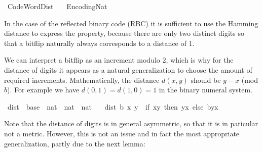 %
\begin{isabellebody}%
%
%
\isadelimdocument
%
\endisadelimdocument
%
\isatagdocument
%
\isamarkuptrue%
%
\endisatagdocument
{\isafolddocument}%
%
\isadelimdocument
%
\endisadelimdocument
%
\isadelimtheory
%
\endisadelimtheory
%
\isatagtheory
{}\isamarkupfalse%
\ Code{\isacharunderscore}{\kern0pt}Word{\isacharunderscore}{\kern0pt}Dist\isanewline
\ \ \ Encoding{\isacharunderscore}{\kern0pt}Nat\isanewline
{}%
\endisatagtheory
{\isafoldtheory}%
%
\isadelimtheory
%
\endisadelimtheory
%
\begin{isamarkuptext}%
In the case of the reflected binary code (RBC) it is sufficient
  to use the Hamming distance to express the property, because there are
  only two distinct digits so that a bitflip naturally always corresponds
  to a distance of 1.%
\end{isamarkuptext}\isamarkuptrue%
%
\isadelimdocument
%
\endisadelimdocument
%
\isatagdocument
%
\isamarkuptrue%
%
\endisatagdocument
{\isafolddocument}%
%
\isadelimdocument
%
\endisadelimdocument
%
\begin{isamarkuptext}%
We can interpret a bitflip as an increment modulo 2, which is why for the
  distance of digits it appears as a natural generalization to choose the
  amount of required increments.
Mathematically, the distance $d(x,y)$ should be $y-x$ (mod $b$).
For example we have $d(0,1) = d(1,0) = 1$ in the binary numeral system.%
\end{isamarkuptext}\isamarkuptrue%
\isamarkupfalse%
\ dist{}\ {\isacharcolon}{\kern0pt}{\isacharcolon}{\kern0pt}\ {\isachardoublequoteopen}base\ {\isasymRightarrow}\ nat\ {\isasymRightarrow}\ nat\ {\isasymRightarrow}\ nat{\isachardoublequoteclose}\ \isanewline
\ \ {\isachardoublequoteopen}dist{}\ b\ x\ y\ {\isasymequiv}\ if\ x{\isasymle}y\ then\ y{\isacharminus}{\kern0pt}x\ else\ b{\isacharplus}{\kern0pt}y{\isacharminus}{\kern0pt}x{\isachardoublequoteclose}%
\begin{isamarkuptext}%
Note that the distance of digits is in general asymmetric, so that it is
  in paticular not a metric. However, this is not an issue and in fact the
  most appropriate generalization, partly due to the next lemma:%
\end{isamarkuptext}\isamarkuptrue%

\end{isabellebody}
